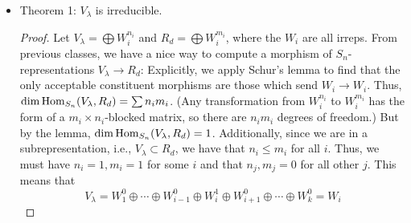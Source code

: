 \documentclass[../notes.tex]{subfiles}
\begin{document}
\begin{itemize}
\begin{proof}
        \begin{equation*}
            P(x_1,\dots,x_n) := f(\Delta(x_1,\dots,x_{\lambda_1'})\Delta(x_{\lambda_1'+1},\dots,x_{\lambda_2'})\dots)
        \end{equation*}
        By definition, the degree of $P$ is $d$. Additionally, because $f$ is a morphism of $S_n$-representations as an element of $\Hom_{S_n}(V_\lambda,R_d)$, we have that $f$ is linear and hence, since the argument of $f$ is antisymmetric in $x_1,\dots,x_{\lambda_1'}$, so $P$ similarly antisymmetric. $P$ is also antisymmetric in $x_{\lambda_1'+1},\dots,x_{\lambda_2'}$. In fact, $P$ is antisymmetric in all such sets all the way up to $x_{\lambda_{k'-1}'+1},\dots,x_{\lambda_{k'}'}$. It follows that $P(x_1,\dots,x_n)$ is divisible by $\Delta(x_1,\dots,x_{\lambda_i'})$, etc., i.e., all Vandermonde determinants. Thus, $P(x_1,\dots,x_n)$ is divisible by the product, which is the $d$-degree Specht polynomial argument of $f$. It follows that
        \begin{equation*}
            P(x_1,\dots,x_n) = u\cdot\Delta(x_1,\dots,x_{\lambda_1'})\Delta(x_{\lambda_1'+1},\dots,x_{\lambda_2'})\dots
        \end{equation*}
        from which it follows that $f=uI$. This implies the claim via the isomorphism $f\mapsto u$.
    \end{proof}
    \item Theorem 1: $V_\lambda$ is irreducible.
    \begin{proof}
        Let $V_\lambda=\bigoplus W_i^{n_i}$ and $R_d=\bigoplus W_i^{m_i}$, where the $W_i$ are all irreps. From previous classes, we have a nice way to compute a morphism of $S_n$-representations $V_\lambda\to R_d$: Explicitly, we apply Schur's lemma to find that the only acceptable constituent morphisms are those which send $W_i\to W_i$. Thus, $\dim\operatorname{Hom}_{S_n}(V_\lambda,R_d)=\sum n_im_i$. (Any transformation from $W_i^{n_i}$ to $W_i^{m_i}$ has the form of a $m_i\times n_i$-blocked matrix, so there are $n_im_i$ degrees of freedom.) But by the lemma, $\dim\operatorname{Hom}_{S_n}(V_\lambda,R_d)=1$. Additionally, since we are in a subrepresentation, i.e., $V_\lambda\subset R_d$, we have that $n_i\leq m_i$ for all $i$. Thus, we must have $n_i=1,m_i=1$ for some $i$ and that $n_j,m_j=0$ for all other $j$. This means that
        \begin{equation*}
            V_\lambda = W_1^0\oplus\cdots\oplus W_{i-1}^0\oplus W_i^1\oplus W_{i+1}^0\oplus\cdots\oplus W_k^0
            = W_i
        \end{equation*}

\end{proof}
\end{itemize}
\end{document}
